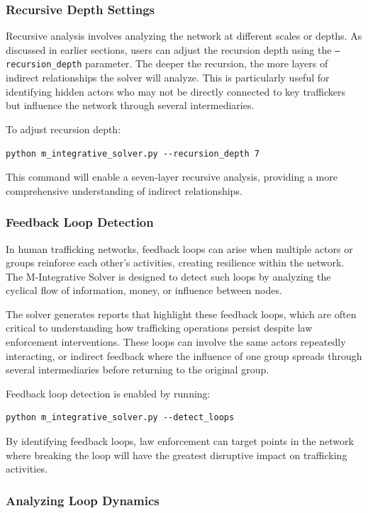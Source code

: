 \documentclass[%
 preprint, linenumbers,
 amsmath,amssymb,
 aps, physrev,
]{revtex4-2}
\begin{document}
\subsubsection{Recursive Depth Settings}

Recursive analysis involves analyzing the network at different scales or depths. As discussed in earlier sections, users can adjust the recursion depth using the \texttt{--recursion\_depth} parameter. The deeper the recursion, the more layers of indirect relationships the solver will analyze. This is particularly useful for identifying hidden actors who may not be directly connected to key traffickers but influence the network through several intermediaries.

To adjust recursion depth:
\begin{verbatim}
python m_integrative_solver.py --recursion_depth 7
\end{verbatim}
This command will enable a seven-layer recursive analysis, providing a more comprehensive understanding of indirect relationships.

\subsubsection{Feedback Loop Detection}

In human trafficking networks, feedback loops can arise when multiple actors or groups reinforce each other’s activities, creating resilience within the network. The M-Integrative Solver is designed to detect such loops by analyzing the cyclical flow of information, money, or influence between nodes.

The solver generates reports that highlight these feedback loops, which are often critical to understanding how trafficking operations persist despite law enforcement interventions. These loops can involve the same actors repeatedly interacting, or indirect feedback where the influence of one group spreads through several intermediaries before returning to the original group.

Feedback loop detection is enabled by running:
\begin{verbatim}
python m_integrative_solver.py --detect_loops
\end{verbatim}

By identifying feedback loops, law enforcement can target points in the network where breaking the loop will have the greatest disruptive impact on trafficking activities.

\subsubsection{Analyzing Loop Dynamics}
\end{document}

